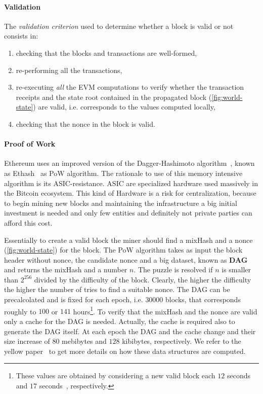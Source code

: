 \paragraph{Validation}
The \emph{validation criterion} used to determine whether a block is valid or
not consists in:
\begin{enumerate}
    \item checking that the blocks and transactions are well-formed,
    \item re-performing all the transactions,
    \item re-executing \emph{all} the EVM computations to verify whether the
    transaction receipts and the state root contained in the propagated block
    (\autoref{fig:world-state}) are valid, i.e. corresponds to the values
    computed locally,
    \item checking that the nonce in the block is valid.
\end{enumerate}

\paragraph{Proof of Work}
Ethereum uses an improved version of the
Dagger-Hashimoto algorithm~\cite{bib:dagger-hashimoto}, known as
Ethash~\cite[Appendix J]{wood2018ethereum} as PoW algorithm.
The rationale to use of this memory intensive algorithm is its
ASIC-resistance. ASIC are specialized hardware used massively in the Bitcoin
ecosystem. This kind of Hardware is a risk for centralization,
because to begin mining new blocks and maintaining the infrastructure a big
initial investment is needed and only few entities and definitely not private
parties can afford this cost.

Essentially to create a valid block the miner should find a mixHash and
a nonce (\autoref{fig:world-state}) for the block.
The PoW algorithm takes as input the block header without nonce,
the candidate nonce and a big dataset, known as \textbf{DAG} and
returns the mixHash and a number $n$. The puzzle is resolved if
$n$ is smaller than $2^{256}$ divided by the difficulty of the block. Clearly,
the higher the difficulty the higher the number of tries to find a suitable
nonce. The DAG can be precalcolated and is fixed for each epoch, i.e.
$30000$ blocks, that corresponds roughly to $100$ or $141$ hours\footnote{
These values are obtained by considering a new valid block each $12$
seconds~\cite{bib:} and $17$ seconds~\cite{bib:solidity-docs}, respectively.}.
To verify that the mixHash and the nonce are valid only a cache for the DAG is
needed. Actually, the cache is required also to generate the DAG itself.
At each epoch the DAG and the cache change and their size increase of
$80$ mebibytes and $128$ kibibytes, respectively.
We refer to the yellow paper~\cite[Appendix J]{wood2018ethereum} to get more
details on how these data structures are computed.



